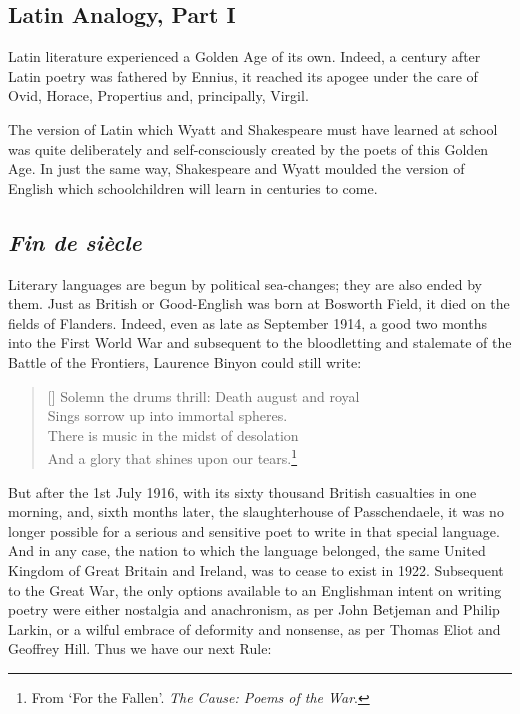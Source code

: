\documentclass[0main.tex]{subfiles}
\begin{document}
\subsection{Latin Analogy, Part I}

Latin literature experienced a Golden Age of its own. Indeed, a century after Latin poetry was fathered by Ennius, it reached its apogee under the care of Ovid, Horace, Propertius and, principally, Virgil.

The version of Latin which Wyatt and Shakespeare must have learned at school was quite deliberately and self-consciously created by the poets of this Golden Age. In just the same way, Shakespeare and Wyatt moulded the version of English which schoolchildren will learn in centuries to come.

\subsection{\emph{Fin de si\`ecle}}

Literary languages are begun by political sea-changes; they are also ended by them. Just as British or Good-English was born at Bosworth Field, it died on the fields of Flanders. Indeed, even as late as September 1914, a good two months into the First World War and subsequent to the bloodletting and stalemate of the Battle of the Frontiers, Laurence Binyon could still write:\\

\settowidth{\versewidth}{\footnotesize Solemn the drums thrill: Death august and royal}
\begin{verse}[\versewidth]
{\footnotesize
Solemn the drums thrill: Death august and royal\\
Sings sorrow up into immortal spheres.\\
There is music in the midst of desolation\\
And a glory that shines upon our tears.\footnote{From `For the Fallen'. \emph{The Cause: Poems of the War}.}\\
}
\end{verse}

\bigskip

But after the 1st July 1916, with its sixty thousand British casualties in one morning, and, sixth months later, the slaughterhouse of Passchendaele, it was no longer possible for a serious and sensitive poet to write in that special language. And in any case, the nation to which the language belonged, the same United Kingdom of Great Britain and Ireland, was to cease to exist in 1922. Subsequent to the Great War, the only options available to an Englishman intent on writing poetry were either nostalgia and anachronism, as per John Betjeman and Philip Larkin, or a wilful embrace of deformity and nonsense, as per Thomas Eliot and Geoffrey Hill. Thus we have our next Rule:
\end{document}

